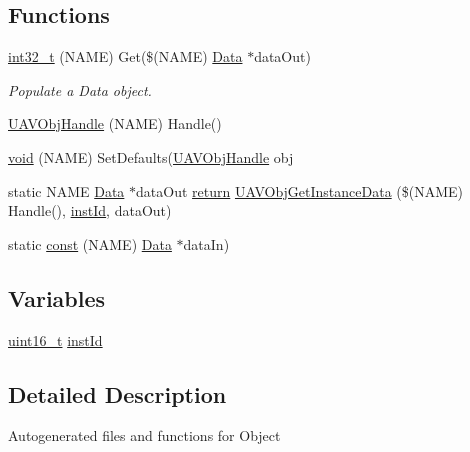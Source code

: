 \subsection*{Functions}
\begin{DoxyCompactItemize}
\item 
\hyperlink{group___n_a_m_e_gaa34ba9782a7d1ad23bab0e56fe0ab0e6}{int32\-\_\-t} (N\-A\-M\-E) Get(\$(N\-A\-M\-E) \hyperlink{group___copter_control_b_l_ga6f3335509cc4943e20df66f72483910c}{Data} $\ast$data\-Out)
\begin{DoxyCompactList}\small\item\em Populate a Data object. \end{DoxyCompactList}\item 
\hyperlink{group___n_a_m_e_ga3f861d1cf8717538418ac3c1c82f2b6d}{U\-A\-V\-Obj\-Handle} (N\-A\-M\-E) Handle()
\item 
\hyperlink{group___n_a_m_e_ga18028b8badbf1ea7e704ccac3c488e82}{void} (N\-A\-M\-E) Set\-Defaults(\hyperlink{group___n_a_m_e_gac31715ab50a1903838e7d87c8022ec75}{U\-A\-V\-Obj\-Handle} obj
\item 
static N\-A\-M\-E \hyperlink{group___copter_control_b_l_ga6f3335509cc4943e20df66f72483910c}{Data} $\ast$data\-Out \hyperlink{group___c_m_s_i_s___core___instruction_interface_ga0705cb6b31823e7d40c6e0046a1472aa}{return} \hyperlink{group___n_a_m_e_ga811993e1535304d5f6f9f9de5f4486cd}{U\-A\-V\-Obj\-Get\-Instance\-Data} (\$(N\-A\-M\-E) Handle(), \hyperlink{group___n_a_m_e_ga874457c6d2526c90ec75fa5a37d687ca}{inst\-Id}, data\-Out)
\item 
static \hyperlink{group___n_a_m_e_ga7ae6d0e43244213b34de2c2b9aa30da6}{const} (N\-A\-M\-E) \hyperlink{group___copter_control_b_l_ga6f3335509cc4943e20df66f72483910c}{Data} $\ast$data\-In)
\end{DoxyCompactItemize}
\subsection*{Variables}
\begin{DoxyCompactItemize}
\item 
\hyperlink{stdint_8h_a273cf69d639a59973b6019625df33e30}{uint16\-\_\-t} \hyperlink{group___n_a_m_e_ga874457c6d2526c90ec75fa5a37d687ca}{inst\-Id}
\end{DoxyCompactItemize}


\subsection{Detailed Description}
Autogenerated files and functions for  Object 

